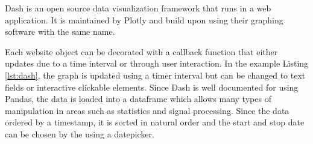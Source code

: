 Dash is an open source data visualization framework that runs in a web application. It is maintained by Plotly and build upon using their graphing software with the same name.



Each website object can be decorated with a callback function that either updates due to a time interval or through user interaction. In the example Listing \ref{lst:dash}, the graph is updated using a timer interval but can be changed to text fields or interactive clickable elements. Since Dash is well documented for using Pandas, the data is loaded into a dataframe which allows many types of manipulation in areas such as statistics and signal processing. Since the data ordered by a timestamp, it is sorted in natural order and the start and stop date can be chosen by the using a datepicker.
